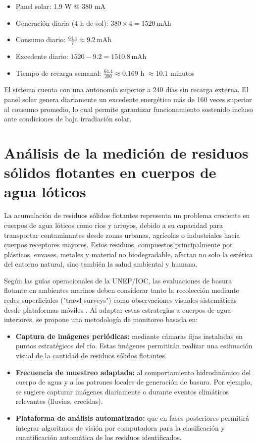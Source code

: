 \begin{itemize}
    \item Panel solar: 1.9 W @ 380 mA
    \item Generación diaria (4 h de sol): $380 \times 4 = 1520$\,mAh
    \item Consumo diario: $\frac{64.4}{7} \approx 9.2$\,mAh
    \item Excedente diario: $1520 - 9.2 = 1510.8$\,mAh
    \item Tiempo de recarga semanal: $\frac{64.4}{380} \approx 0.169$ h $\approx 10.1$ minutos
\end{itemize}

 El sistema cuenta con una autonomía superior a 240 días sin recarga externa. El panel solar genera diariamente un excedente energético más de 160 veces superior al consumo promedio, lo cual permite garantizar funcionamiento sostenido incluso ante condiciones de baja irradiación solar.



\section{Análisis de la medición de residuos sólidos flotantes en cuerpos de agua lóticos}

La acumulación de residuos sólidos flotantes representa un problema creciente en cuerpos de agua lóticos como ríos y arroyos, debido a su capacidad para transportar contaminantes desde zonas urbanas, agrícolas o industriales hacia cuerpos receptores mayores. Estos residuos, compuestos principalmente por plásticos, envases, metales y material no biodegradable, afectan no solo la estética del entorno natural, sino también la salud ambiental y humana.

Según las guías operacionales de la UNEP/IOC, las evaluaciones de basura flotante en ambientes marinos deben considerar tanto la recolección mediante redes superficiales ("trawl surveys") como observaciones visuales sistemáticas desde plataformas móviles \cite{cheshire2009directrices}. Al adaptar estas estrategias a cuerpos de agua interiores, se propone una metodología de monitoreo basada en:

\begin{itemize}
    \item \textbf{Captura de imágenes periódicas:} mediante cámaras fijas instaladas en puntos estratégicos del río. Estas imágenes permitirán realizar una estimación visual de la cantidad de residuos sólidos flotantes.
    \item \textbf{Frecuencia de muestreo adaptada:} al comportamiento hidrodinámico del cuerpo de agua y a los patrones locales de generación de basura. Por ejemplo, se sugiere capturar imágenes diariamente o durante eventos climáticos relevantes (lluvias, crecidas).
    \item \textbf{Plataforma de análisis automatizado:} que en fases posteriores permitirá integrar algoritmos de visión por computadora para la clasificación y cuantificación automática de los residuos identificados.
\end{itemize}

